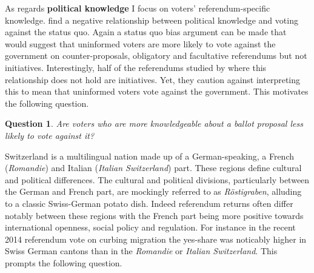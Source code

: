 \documentclass[11pt,a4paper]{article}\usepackage[]{graphicx}\usepackage[]{color}
\newtheorem{question}{Question}
\begin{document}
    
    As regards \textbf{political knowledge} I focus on voters' referendum-specific knowledge. \citet{christin_interests_2002} find a negative relationship between political knowledge and voting against the status quo. Again a status quo bias argument can be made that would suggest that uninformed voters are more likely to vote against the government on counter-proposals, obligatory and facultative referendums but not initiatives. Interestingly, half of the referendums studied by \citet{christin_interests_2002} where this relationship does not hold are initiatives. Yet, they caution against interpreting this to mean that uninformed voters vote against the government. This motivates the following question.       
    
     \begin{question}
      \begin{minipage}[t]{4 in}
    	Are voters who are more knowledgeable about a ballot proposal less likely to vote against it?
      \end{minipage}
    \end{question}
    
%     
    
    Switzerland is a multilingual nation made up of a German-speaking, a French (\textit{Romandie}) and Italian (\textit{Italian Switzerland}) part. %
    These regions define cultural and political differences. The cultural and political divisions, particularly between the German and French part, are mockingly referred to as \textit{Röstigraben}, alluding to a classic Swiss-German potato dish. Indeed referendum returns often differ notably between these regions with the French part being more positive towards international openness, social policy and regulation. For instance in the recent 2014 referendum vote on curbing migration the yes-share was noticably higher in Swiss German cantons than in the \textit{Romandie} or \textit{Italian Switzerland}. This prompts the following question. 
    
\end{document}
